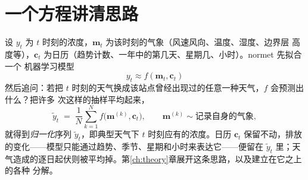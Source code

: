 \documentclass[11pt]{ctexrep}
\newcommand{\nm}{\textsf{normet}}
\begin{document}
\section{一个方程讲清思路}
设 $y_t$ 为 $t$ 时刻的浓度，$\mathbf{m}_t$ 为该时刻的气象（风速风向、温度、湿度、边界层
高度等），$\mathbf{c}_t$ 为日历（趋势计数、一年中的第几天、星期几、小时）。\nm{} 先拟合一个
机器学习模型
\begin{equation}
  y_t \approx f(\mathbf{m}_t, \mathbf{c}_t)
\end{equation}
然后追问：若把 $t$ 时刻的天气换成该站点曾经出现过的任意一种天气，$f$ 会预测出什么？把许多
次这样的抽样平均起来，
\begin{equation}
  \tilde{y}_t \;=\; \frac{1}{N}\sum_{k=1}^{N} f\bigl(\mathbf{m}^{(k)}, \mathbf{c}_t\bigr),
  \qquad \mathbf{m}^{(k)} \sim \text{记录自身的气象},
  \label{eq:norm}
\end{equation}
就得到\emph{归一化}序列 $\tilde{y}_t$，即典型天气下 $t$ 时刻应有的浓度。日历 $\mathbf{c}_t$
保留不动，排放的变化——模型只能通过趋势、季节、星期和小时来表达它——便留在 $\tilde{y}_t$
里；天气造成的逐日起伏则被平均掉。第\ref{ch:theory}章展开这条思路，以及建立在它之上的各种
分解。
\end{document}
